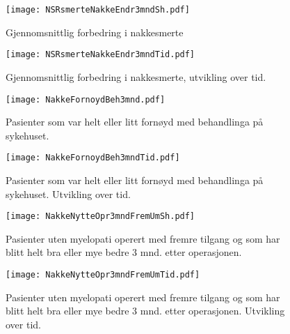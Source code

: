 \documentclass[presentation,xcolor=pdftex,dvipsnames,table]{beamer}\usepackage[]{graphicx}\usepackage[]{color}
\begin{document}
\begin{tiny}
\begin{frame}[fragile]
\begin{figure}[ht]
\centering
\texttt{[image: NSRsmerteNakkeEndr3mndSh.pdf]}
\caption{Gjennomsnittlig forbedring i nakkesmerte}
\end{figure}
\end{frame}

\begin{frame}[fragile]
\begin{figure}[ht]
\centering
\texttt{[image: NSRsmerteNakkeEndr3mndTid.pdf]}
\caption{Gjennomsnittlig forbedring i nakkesmerte, utvikling over tid.}
\end{figure}
\end{frame}

\begin{frame}[fragile]
\begin{figure}[ht]
\centering
\texttt{[image: NakkeFornoydBeh3mnd.pdf]}
\caption{Pasienter som var helt eller litt fornøyd med behandlinga på sykehuset. }
\end{figure}
\end{frame}

\begin{frame}[fragile]
\begin{figure}[ht]
\centering
\texttt{[image: NakkeFornoydBeh3mndTid.pdf]}
\caption{Pasienter som var helt eller litt fornøyd med behandlinga på sykehuset. Utvikling over tid. }
\end{figure}
\end{frame}


\begin{frame}[fragile]
\begin{figure}[ht]
\centering
\texttt{[image: NakkeNytteOpr3mndFremUmSh.pdf]}
\caption{Pasienter uten myelopati operert med fremre tilgang og som har blitt helt bra eller mye bedre 3 mnd. etter operasjonen. }
\end{figure}
\end{frame}

\begin{frame}[fragile]
\begin{figure}[ht]
\centering
\texttt{[image: NakkeNytteOpr3mndFremUmTid.pdf]}
\caption{Pasienter uten myelopati operert med fremre tilgang og som har blitt helt bra eller mye bedre 3 mnd. etter operasjonen. Utvikling over tid. }
\end{figure}
\end{frame}


\end{tiny}
\end{document}
